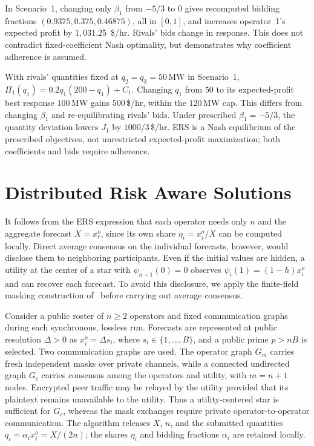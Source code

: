 \documentclass[journal]{IEEEtran}
\begin{document}
In Scenario~1, changing only $\beta_1$ from $-5/3$ to $0$ gives recomputed bidding fractions $(0.9375,0.375,0.46875)$, all in $[0,1]$, and increases operator~1's expected profit by $1{,}031.25$~\$/hr. Rivals' bids change in response. This does not contradict fixed-coefficient Nash optimality, but demonstrates why coefficient adherence is assumed.

With rivals' quantities fixed at $q_2=q_3=50$\,MW in Scenario~1, $\Pi_1(q_1)=0.2q_1(200-q_1)+C_1$. Changing $q_1$ from $50$ to its expected-profit best response $100$\,MW gains $500$\,\$/hr, within the $120$\,MW cap. This differs from changing $\beta_1$ and re-equilibrating rivals' bids. Under prescribed $\beta_1=-5/3$, the quantity deviation lowers $J_1$ by $1000/3$\,\$/hr. ERS is a Nash equilibrium of the prescribed objectives, not unrestricted expected-profit maximization; both coefficients and bids require adherence.

\section{Distributed Risk Aware Solutions}
\label{sec:private_consensus}

It follows from the ERS expression that each operator needs only $n$ and the aggregate forecast $X=x_r^o$, since its own share $\eta_i=x_i^o/X$ can be computed locally. Direct average consensus on the individual forecasts, however, would disclose them to neighboring participants. Even if the initial values are hidden, a utility at the center of a star with $\psi_{n+1}(0)=0$ observes $\psi_i(1)=(1-h)x_i^o$ and can recover each forecast. To avoid this disclosure, we apply the finite-field masking construction of~\cite{Gupta2020PrivateConsensus} before carrying out average consensus.

Consider a public roster of $n\geq2$ operators and fixed communication graphs during each synchronous, lossless run. Forecasts are represented at public resolution $\Delta>0$ as $x_i^o=\Delta s_i$, where $s_i\in\{1,\ldots,B\}$, and a public prime $p>nB$ is selected. Two communication graphs are used. The operator graph $G_m$ carries fresh independent masks over private channels, while a connected undirected graph $G_c$ carries consensus among the operators and utility, with $m=n+1$ nodes. Encrypted peer traffic may be relayed by the utility provided that its plaintext remains unavailable to the utility. Thus a utility-centered star is sufficient for $G_c$, whereas the mask exchanges require private operator-to-operator communication. The algorithm releases $X$, $n$, and the submitted quantities $q_i=\alpha_i x_i^o=X/(2n)$; the shares $\eta_i$ and bidding fractions $\alpha_i$ are retained locally.
\end{document}
